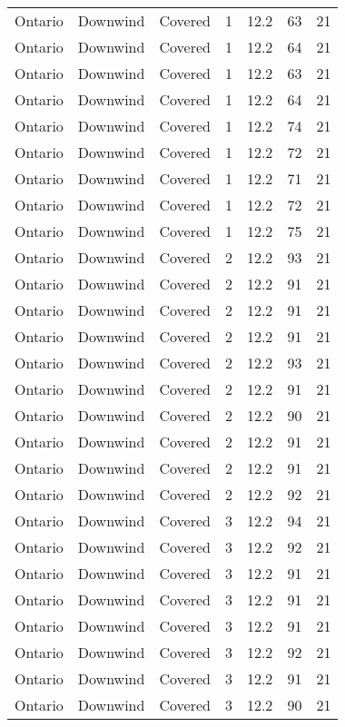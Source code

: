 \documentclass{article}
\begin{document}
\begin{longtable}[H]{ccccccc}
Ontario & Downwind & Covered     & 1 & 12.2 & 63  & 21 \\
Ontario & Downwind & Covered     & 1 & 12.2 & 64  & 21 \\
Ontario & Downwind & Covered     & 1 & 12.2 & 63  & 21 \\
Ontario & Downwind & Covered     & 1 & 12.2 & 64  & 21 \\
Ontario & Downwind & Covered     & 1 & 12.2 & 74  & 21 \\
Ontario & Downwind & Covered     & 1 & 12.2 & 72  & 21 \\
Ontario & Downwind & Covered     & 1 & 12.2 & 71  & 21 \\
Ontario & Downwind & Covered     & 1 & 12.2 & 72  & 21 \\
Ontario & Downwind & Covered     & 1 & 12.2 & 75  & 21 \\
Ontario & Downwind & Covered     & 2 & 12.2 & 93  & 21 \\
Ontario & Downwind & Covered     & 2 & 12.2 & 91  & 21 \\
Ontario & Downwind & Covered     & 2 & 12.2 & 91  & 21 \\
Ontario & Downwind & Covered     & 2 & 12.2 & 91  & 21 \\
Ontario & Downwind & Covered     & 2 & 12.2 & 93  & 21 \\
Ontario & Downwind & Covered     & 2 & 12.2 & 91  & 21 \\
Ontario & Downwind & Covered     & 2 & 12.2 & 90  & 21 \\
Ontario & Downwind & Covered     & 2 & 12.2 & 91  & 21 \\
Ontario & Downwind & Covered     & 2 & 12.2 & 91  & 21 \\
Ontario & Downwind & Covered     & 2 & 12.2 & 92  & 21 \\
Ontario & Downwind & Covered     & 3 & 12.2 & 94  & 21 \\
Ontario & Downwind & Covered     & 3 & 12.2 & 92  & 21 \\
Ontario & Downwind & Covered     & 3 & 12.2 & 91  & 21 \\
Ontario & Downwind & Covered     & 3 & 12.2 & 91  & 21 \\
Ontario & Downwind & Covered     & 3 & 12.2 & 91  & 21 \\
Ontario & Downwind & Covered     & 3 & 12.2 & 92  & 21 \\
Ontario & Downwind & Covered     & 3 & 12.2 & 91  & 21 \\
Ontario & Downwind & Covered     & 3 & 12.2 & 90  & 21 \\

\end{longtable}
\end{document}

